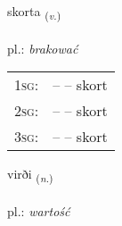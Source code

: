 \documentclass[frontgrid, backgrid]{flacards}\usepackage[]{graphicx}\usepackage[]{xcolor}
\begin{document}
\renewcommand{\flhead}{\vskip5pt \fboxsep=0pt {\small\bfseries\footnotesize Sagnorð | Verb}}
\renewcommand{\fcfoot}{\vskip5pt \fboxsep=0pt \hspace{2pt}{\small\bfseries\footnotesize 2K}}

\renewcommand{\blhead}{\vskip5pt {\small\bfseries\footnotesize Sagnorð | Verb }}
\renewcommand{\bcfoot}{\vskip5pt \hspace{2pt}{\small\bfseries\footnotesize 2K}}


{skorta \small{\textsubscript{(\textit{v.})}} \\[1ex] %
\textphonetic{[skɔr̥ta]} \\
pl.: \emph{brakować} \\  [2ex]
\renewcommand*{\arraystretch}{0.8}
\begin{tabular}{p{1cm}l}
\textsc{1sg}: &  --  -- skort \\ 
\textsc{2sg}: &  --  -- skort \\ 
\textsc{3sg}: &  --  -- skort \\ 
\end{tabular}
}

\renewcommand{\flhead}{\vskip5pt \fboxsep=0pt {\small\bfseries\footnotesize Nafnorð | Noun}}
\renewcommand{\fcfoot}{\vskip5pt \fboxsep=0pt \hspace{2pt}{\small\bfseries\footnotesize 2K}}

\renewcommand{\blhead}{\vskip5pt {\small\bfseries\footnotesize Nafnorð | Noun }}
\renewcommand{\bcfoot}{\vskip5pt \hspace{2pt}{\small\bfseries\footnotesize 2K}}


{virði \small{\textsubscript{(\textit{n.})}} \\[1ex] %
\textphonetic{[vɪrðɪ]} \\
pl.: \emph{wartość} \\  [2ex]
\renewcommand*{\arraystretch}{0.8}
}
\end{document}
